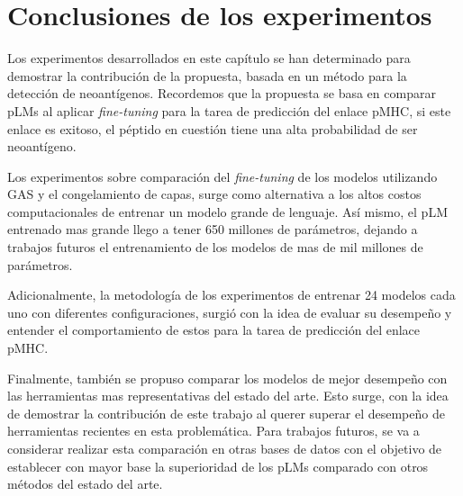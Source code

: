 \section{Conclusiones de los experimentos}

Los experimentos desarrollados en este capítulo se han determinado para demostrar la contribución de la propuesta, basada en un método para la detección de neoantígenos. Recordemos que la propuesta se basa en comparar pLMs al aplicar \textit{fine-tuning} para la tarea de predicción del enlace pMHC, si este enlace es exitoso, el péptido en cuestión tiene una alta probabilidad de ser neoantígeno. 

Los experimentos sobre comparación del \textit{fine-tuning} de los modelos utilizando GAS y el congelamiento de capas, surge como alternativa a los altos costos computacionales de entrenar un modelo grande de lenguaje. Así mismo, el pLM entrenado mas grande llego a tener 650 millones de parámetros, dejando a trabajos futuros el entrenamiento de los modelos de mas de mil millones de parámetros.

Adicionalmente, la metodología de los experimentos de entrenar 24 modelos cada uno con diferentes configuraciones, surgió con la idea de evaluar su desempeño y entender el comportamiento de estos para la tarea de predicción del enlace pMHC. 

Finalmente, también se propuso comparar los modelos de mejor desempeño con las herramientas mas representativas del estado del arte. Esto surge, con la idea de demostrar la contribución de este trabajo al querer superar el desempeño de herramientas recientes en esta problemática. Para trabajos futuros, se va a considerar realizar esta comparación en otras bases de datos con el objetivo de establecer con mayor base la superioridad de los pLMs comparado con otros métodos del estado del arte.
